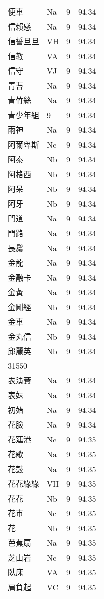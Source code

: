 \documentclass[twocolumn]{book}
\begin{document}
\begin{supertabular}{llrr}
便車 & Na & 9 &  94.34\\
信賴感 & Na & 9 &  94.34\\
信誓旦旦 & VH & 9 &  94.34\\
信教 & VA & 9 &  94.34\\
信守 & VJ & 9 &  94.34\\
青苔 & Na & 9 &  94.34\\
青竹絲 & Na & 9 &  94.34\\
青少年組 & 9 & 9 &  94.34\\
雨神 & Na & 9 &  94.34\\
阿爾卑斯 & Nc & 9 &  94.34\\
阿泰 & Nb & 9 &  94.34\\
阿格西 & Nb & 9 &  94.34\\
阿呆 & Nb & 9 &  94.34\\
阿牙 & Nb & 9 &  94.34\\
門道 & Na & 9 &  94.34\\
門路 & Na & 9 &  94.34\\
長鬚 & Na & 9 &  94.34\\
金龍 & Na & 9 &  94.34\\
金融卡 & Na & 9 &  94.34\\
金黃 & Na & 9 &  94.34\\
金剛經 & Nb & 9 &  94.34\\
金車 & Na & 9 &  94.34\\
金丸信 & Nb & 9 &  94.34\\
邱麗英 & Nb & 9 &  94.34\\
31550\\
表演賽 & Na & 9 &  94.34\\
表妹 & Na & 9 &  94.34\\
初始 & Na & 9 &  94.34\\
花臉 & Na & 9 &  94.34\\
花蓮港 & Nc & 9 &  94.35\\
花歌 & Na & 9 &  94.35\\
花鼓 & Na & 9 &  94.35\\
花花綠綠 & VH & 9 &  94.35\\
花花 & Nb & 9 &  94.35\\
花市 & Nc & 9 &  94.35\\
花 & Nb & 9 &  94.35\\
芭蕉扇 & Na & 9 &  94.35\\
芝山岩 & Nc & 9 &  94.35\\
臥床 & VA & 9 &  94.35\\
肩負起 & VC & 9 &  94.35\\

\end{supertabular}
\end{document}
